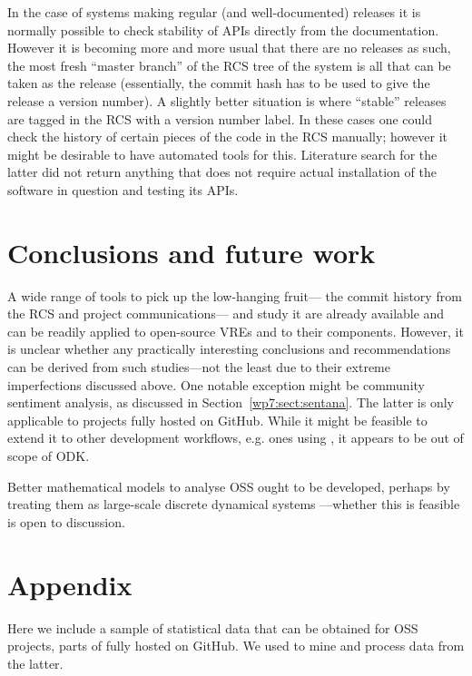 \documentclass{deliverablereport}
\begin{document}
In the case of systems making regular (and well-documented)
releases it is normally possible to check stability of APIs
directly from the documentation. However it is becoming more and
more usual that there are no releases as such, the most fresh
``master branch'' of the RCS tree of the system is all that
can be taken as the release (essentially, the commit
hash has to be used to give the release a version number).
A slightly better situation is where ``stable'' releases are tagged
in the RCS with a version number label.
In these cases one could check the history of certain pieces
of the code in the RCS manually; however it might be 
desirable to have automated tools for this. Literature search for
the latter did not return anything that does not require
actual installation of the software in question and testing its APIs.




\section{Conclusions and future work}
A wide range of tools to pick up the low-hanging fruit--- 
the commit history from the RCS and project communications---
and study it are already available and can be readily applied
to open-source VREs and to their components.
However, it is unclear whether any practically interesting conclusions
and recommendations can be derived from such studies---not
the least due to their extreme imperfections discussed above.
One notable exception might be community sentiment analysis,
as discussed in Section~\ref{wp7:sect:sentana}. The latter is only
applicable to projects fully hosted on GitHub. While it might be
feasible to extend it to other development workflows, e.g. ones
using \cite{wp7:trac}, it appears to be out of scope of ODK.

Better mathematical models to analyse OSS ought to be developed, perhaps
by treating them as large-scale discrete dynamical systems
\cite{Antoulas:2005:ALD:1088857,Minati:2011:MMS:2208175}---whether
this is feasible is open to discussion.

\newpage

\section*{Appendix}
Here we include a sample of statistical data that can be obtained
for OSS projects, parts of \Sage fully hosted on GitHub.
We used \cite{wp7:fossheartbeat} to mine and process data
from the latter.
\end{document}
